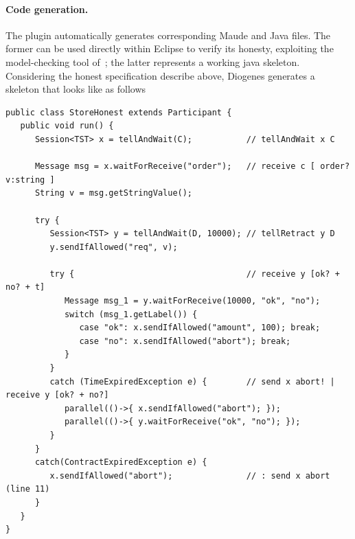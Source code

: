 \paragraph{Code generation.}
The plugin automatically generates corresponding Maude and Java files.
The former can be used directly within Eclipse to verify its honesty,
exploiting the model-checking tool of~\cite{verifiable};
the latter represents a working java skeleton. 
Considering the honest specification describe above,
Diogenes generates a skeleton that looks like as follows
\begin{mdframed}
\begin{verbatim}
public class StoreHonest extends Participant { 
   public void run() {
      Session<TST> x = tellAndWait(C);           // tellAndWait x C
       
      Message msg = x.waitForReceive("order");   // receive c [ order? v:string ]
      String v = msg.getStringValue();
      
      try {
         Session<TST> y = tellAndWait(D, 10000); // tellRetract y D
         y.sendIfAllowed("req", v);
         
         try {                                   // receive y [ok? + no? + t]
            Message msg_1 = y.waitForReceive(10000, "ok", "no");
            switch (msg_1.getLabel()) {                    
               case "ok": x.sendIfAllowed("amount", 100); break;
               case "no": x.sendIfAllowed("abort"); break;                    
            }
         }
         catch (TimeExpiredException e) {        // send x abort! | receive y [ok? + no?] 
            parallel(()->{ x.sendIfAllowed("abort"); });
            parallel(()->{ y.waitForReceive("ok", "no"); });
         }            
      }
      catch(ContractExpiredException e) {
         x.sendIfAllowed("abort");               // : send x abort (line 11)
      }
   }
}
\end{verbatim}
\end{mdframed}


